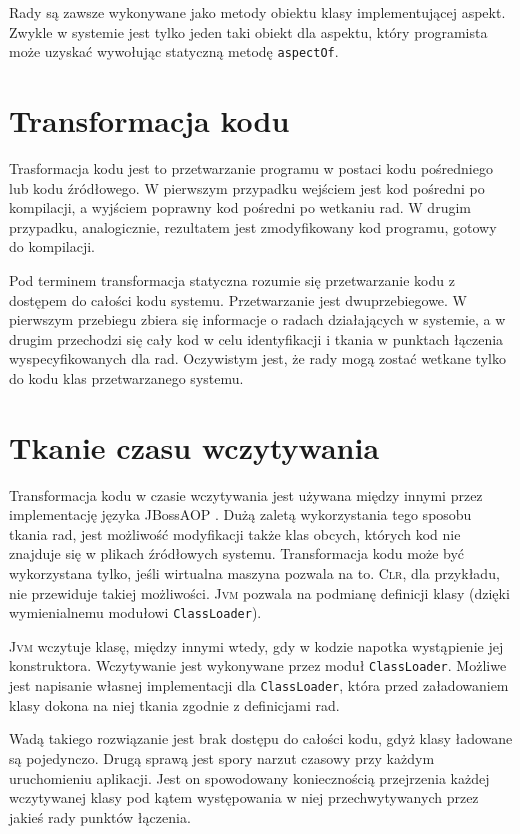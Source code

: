 \documentclass[a4paper,12pt]{mwbk}
\begin{document}
Rady są zawsze wykonywane jako metody obiektu klasy implementującej aspekt.
Zwykle w systemie jest tylko jeden taki obiekt dla aspektu, który programista
może uzyskać wywołując statyczną metodę \lstinline!aspectOf!.

\section{Transformacja kodu}

Trasformacja kodu jest to przetwarzanie programu w postaci kodu pośredniego lub
kodu źródłowego.  W pierwszym przypadku wejściem jest kod pośredni po
kompilacji, a wyjściem poprawny kod pośredni po wetkaniu rad. W drugim
przypadku, analogicznie, rezultatem jest zmodyfikowany kod programu, gotowy do
kompilacji.

Pod terminem transformacja statyczna rozumie się przetwarzanie kodu z dostępem
do całości kodu systemu.  Przetwarzanie jest dwuprzebiegowe. W pierwszym
przebiegu zbiera się informacje o radach działających w systemie, a w
drugim przechodzi się cały kod w celu identyfikacji i tkania w punktach
łączenia wyspecyfikowanych dla rad. Oczywistym jest, że rady mogą zostać
wetkane tylko do kodu klas przetwarzanego systemu.

\section{Tkanie czasu wczytywania}

Transformacja kodu w czasie wczytywania jest używana między innymi przez
implementację języka JBossAOP \cite{jbossaop}.  Dużą zaletą wykorzystania tego
sposobu tkania rad, jest możliwość modyfikacji także klas obcych, których kod
nie znajduje się w plikach źródłowych systemu. Transformacja kodu może być
wykorzystana tylko, jeśli wirtualna maszyna pozwala na to. \textsc{Clr}, dla
przykładu, nie przewiduje takiej możliwości.  \textsc{Jvm} pozwala na podmianę
definicji klasy (dzięki wymienialnemu modułowi \lstinline!ClassLoader!).

\textsc{Jvm} wczytuje klasę, między innymi wtedy, gdy w kodzie napotka
wystąpienie jej konstruktora. Wczytywanie jest wykonywane przez moduł
\lstinline!ClassLoader!. Możliwe jest napisanie własnej implementacji dla
\lstinline!ClassLoader!, która przed załadowaniem klasy dokona na niej tkania
zgodnie z definicjami rad. 

Wadą takiego rozwiązanie jest brak dostępu do całości kodu, gdyż klasy ładowane
są pojedynczo. Drugą sprawą jest spory narzut czasowy przy każdym uruchomieniu
aplikacji. Jest on spowodowany koniecznością przejrzenia każdej wczytywanej klasy pod
kątem występowania w niej przechwytywanych przez jakieś rady punktów łączenia.
\end{document}
